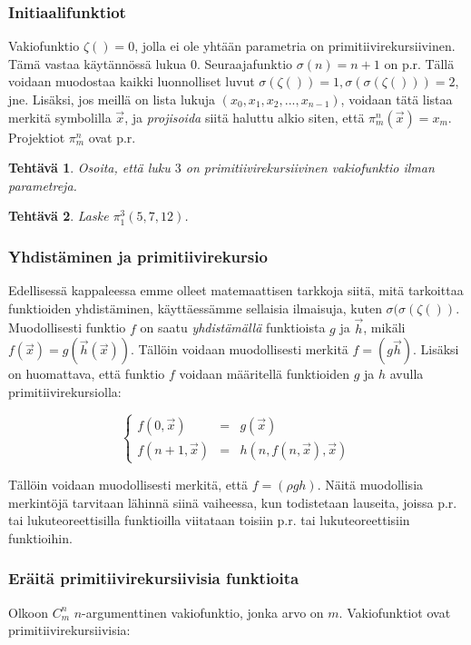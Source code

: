 \documentclass[a4paper]{article}
\newtheorem{tehtava}{Tehtävä}
\begin{document}
\subsubsection{Initiaalifunktiot}
Vakiofunktio $\zeta()=0$, jolla ei ole yhtään parametria on primitiivirekursiivinen.
Tämä vastaa käytännössä lukua $0$. Seuraajafunktio $\sigma(n)=n+1$ on p.r.
Tällä voidaan muodostaa kaikki luonnolliset luvut $\sigma(\zeta())=1,
\sigma(\sigma(\zeta()))=2$, jne. Lisäksi, jos meillä on lista lukuja
$(x_0,x_1,x_2,...,x_{n-1})$, voidaan tätä listaa merkitä symbolilla $\vec{x}$, ja
\emph{projisoida} siitä haluttu alkio siten, että $\pi_m^n(\vec{x})=x_m$.
Projektiot $\pi_m^n$ ovat p.r.
\begin{tehtava}
Osoita, että luku $3$ on primitiivirekursiivinen vakiofunktio ilman parametreja.
\end{tehtava}
\begin{tehtava}
Laske $\pi_1^3(5,7,12)$.
\end{tehtava}

\subsubsection{Yhdistäminen ja primitiivirekursio}
Edellisessä kappaleessa emme olleet matemaattisen tarkkoja siitä, mitä
tarkoittaa funktioiden yhdistäminen, käyttäessämme sellaisia ilmaisuja, kuten
$\sigma(\sigma(\zeta())$. Muodollisesti funktio $f$ on saatu \emph{yhdistämällä}
funktioista $g$ ja $\vec{h}$, mikäli $f(\vec{x})=g(\vec{h}(\vec{x}))$. Tällöin
voidaan muodollisesti merkitä $f=(g\vec{h})$.
Lisäksi on huomattava, että funktio $f$ voidaan määritellä funktioiden $g$ ja $h$
avulla primitiivirekursiolla:

\begin{equation}
\left\{
\begin{array}{lcl}
f(0,\vec{x}) & = & g(\vec{x}) \\
f(n+1,\vec{x}) & = & h(n, f(n,\vec{x}), \vec{x})
\end{array}
\right.
\end{equation}

Tällöin voidaan muodollisesti merkitä, että $f=(\rho gh)$. Näitä muodollisia
merkintöjä tarvitaan lähinnä siinä vaiheessa, kun todistetaan lauseita, joissa
p.r. tai lukuteoreettisilla funktioilla viitataan toisiin p.r. tai lukuteoreettisiin
funktioihin.

\subsubsection{Eräitä primitiivirekursiivisia funktioita}
Olkoon $C_m^n$ $n$-argumenttinen vakiofunktio, jonka arvo on $m$. Vakiofunktiot
ovat primitiivirekursiivisia:
\end{document}
